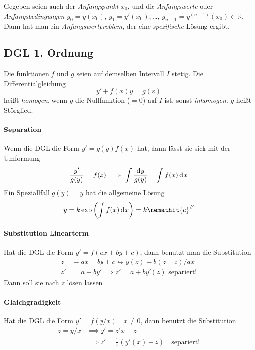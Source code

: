 \documentclass[margin=small, twocolumn]{hsrzf}
\numberwithin{equation}{subsection}
\begin{document}
Gegeben seien auch der \emph{Anfangspunkt}
\(x_0\), und
die \emph{Anfangswerte} oder \emph{Anfangsbedingungen}
\(y_0 = y(x_0)\),
\(y_1 = y'(x_0)\),
\dots,
\(y_{n-1} = y^{(n-1)}(x_0) \in \mathbb{R}\).
Dann hat man ein \emph{Anfangswertproblem}, der eine \emph{spezifische} L\"osung ergibt.

\subsection{DGL 1. Ordnung}
Die funktionen \(f\) und \(g\) seien auf demselben Intervall \(I\) stetig. Die Differentialgleichung
\[
    y' + f(x)y = g(x)
\]
hei{\ss}t \emph{homogen}, wenn \(g\) die Nullfunktion (\(=0\)) auf \(I\) ist, sonst \emph{inhomogen}. \(g\) hei{\ss}t St\"orglied.

\paragraph{Separation} Wenn die DGL die Form \(y' = g(y) f(x)\) hat, dann l\"asst sie sich mit der Umformung
\begin{gather*}
    \frac{y'}{g(y)} = f(x) \implies \int \frac{\mathrm{d}^{} y}{g(y)} = \int f(x) \,\mathrm{d}^{} x \\
\end{gather*}
Ein Speziallfall \(g(y) = y\) hat die allgemeine L\"osung
\[
    y = k\exp\left(\int f(x) \di{x} \right) = k \nemathit{e}^{F}
\]

\paragraph{Substitution Linearterm} Hat die DGL die Form \(y' = f(ax + by + c)\), dann benutzt man die Substitution
\begin{align*}
    z  &= ax + by + c \iff y(z) = b(z-c)/ax \\
    z' &= a + by' \implies z' = a + b y'(z) \text{ separiert!}
\end{align*}
Dann soll sie nach \(z\) l\"osen lassen.

\paragraph{Glaichgradigkeit} Hat die DGL die Form \(y' = f(y/x) \quad x \neq 0\), dann benutzt die Substitution
\begin{align*}
    z = y/x &\implies y' = z'x + z \\
    &\implies z' = \frac{1}{x}\left(y'(x) - z\right) \quad\text{separiert!}
\end{align*}
\end{document}
